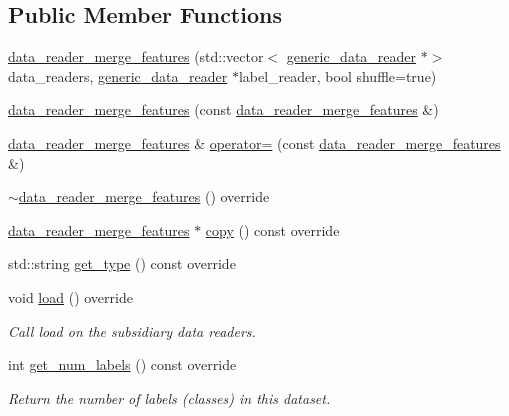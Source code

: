 \subsection*{Public Member Functions}
\begin{DoxyCompactItemize}
\item 
\hyperlink{classlbann_1_1data__reader__merge__features_ac05d7a06c3a5749afc41c3b86bb2475d}{data\+\_\+reader\+\_\+merge\+\_\+features} (std\+::vector$<$ \hyperlink{classlbann_1_1generic__data__reader}{generic\+\_\+data\+\_\+reader} $\ast$$>$ data\+\_\+readers, \hyperlink{classlbann_1_1generic__data__reader}{generic\+\_\+data\+\_\+reader} $\ast$label\+\_\+reader, bool shuffle=true)
\item 
\hyperlink{classlbann_1_1data__reader__merge__features_a41d55ea605d94ea010126b11ee420778}{data\+\_\+reader\+\_\+merge\+\_\+features} (const \hyperlink{classlbann_1_1data__reader__merge__features}{data\+\_\+reader\+\_\+merge\+\_\+features} \&)
\item 
\hyperlink{classlbann_1_1data__reader__merge__features}{data\+\_\+reader\+\_\+merge\+\_\+features} \& \hyperlink{classlbann_1_1data__reader__merge__features_a2df9360e463c2ceaf4ba42e287f673b9}{operator=} (const \hyperlink{classlbann_1_1data__reader__merge__features}{data\+\_\+reader\+\_\+merge\+\_\+features} \&)
\item 
\hyperlink{classlbann_1_1data__reader__merge__features_af194453b7028b116657b95631acca81d}{$\sim$data\+\_\+reader\+\_\+merge\+\_\+features} () override
\item 
\hyperlink{classlbann_1_1data__reader__merge__features}{data\+\_\+reader\+\_\+merge\+\_\+features} $\ast$ \hyperlink{classlbann_1_1data__reader__merge__features_aa079ec1e03557e2c469f9da6e8aa45a8}{copy} () const override
\item 
std\+::string \hyperlink{classlbann_1_1data__reader__merge__features_affcf91a640f964ba18de9cb650fb07ad}{get\+\_\+type} () const override
\item 
void \hyperlink{classlbann_1_1data__reader__merge__features_a8a618de9a92cb148746a83b0381ba781}{load} () override
\begin{DoxyCompactList}\small\item\em Call load on the subsidiary data readers. \end{DoxyCompactList}\item 
int \hyperlink{classlbann_1_1data__reader__merge__features_a63be746ea35e664b5cc8f8b973e86209}{get\+\_\+num\+\_\+labels} () const override
\begin{DoxyCompactList}\small\item\em Return the number of labels (classes) in this dataset. \end{DoxyCompactList}\item 
$$
\end{DoxyCompactItemize}
